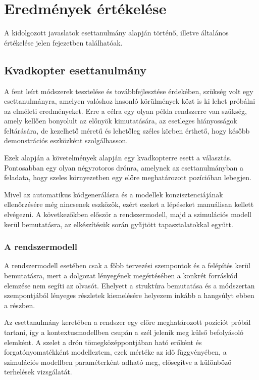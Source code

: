 \chapter{Eredmények értékelése}
A kidolgozott javaslatok esettanulmány alapján történő, illetve általános értékelése jelen fejezetben találhatóak.

\section{Kvadkopter esettanulmány}
A fent leírt módszerek tesztelése és továbbfejlesztése érdekében, szükség volt egy esettanulmányra, amelyen valóshoz hasonló körülmények közt is ki lehet próbálni az elméleti eredményeket.
Erre a célra egy olyan példa rendszerre van szükség, amely kellően bonyolult az előnyök kimutatására, az esetleges hiányosságok feltárására, de kezelhető méretű és lehetőleg széles körben érthető, hogy később demonstrációs eszközként szolgálhasson.

Ezek alapján a követelmények alapján egy kvadkopterre esett a választás. Pontosabban egy olyan négyrotoros drónra, amelynek az esettanulmányban a feladata, hogy szeles környezetben egy előre meghatározott pozícióban lebegjen.

Mivel az automatikus kódgenerálásra és a modellek konzisztenciájának ellenőrzésére még nincsenek eszközök, ezért ezeket a lépéseket manuálisan kellett elvégezni.
A következőkben először a rendszermodell, majd a szimulációs modell kerül bemutatásra, az elkészítésük során gyűjtött tapasztalatokkal együtt.

    \subsection{A rendszermodell}
    A rendszermodell esetében csak a főbb tervezési szempontok és a felépítés kerül bemutatásra, mert a dolgozat lényegének megértésében a konkrét forráskód elemzése nem segíti az olvasót. Ehelyett a struktúra bemutatása és a módszertan szempontjából lényeges részletek kiemelésére helyezem inkább a hangsúlyt ebben a részben.
    
    Az esettanulmány keretében a rendszer egy előre meghatározott pozíciót próbál tartani, így a kontextusmodellben csupán a szél jelenik meg külső befolyásoló elemként.
    A szelet a drón tömegközéppontjában ható erőként és forgatónyomatékként modelleztem, ezek mértéke az idő függvényében, a szimulációs modellben paraméterként adható meg, elősegítve a különböző terhelések vizsgálatát.

